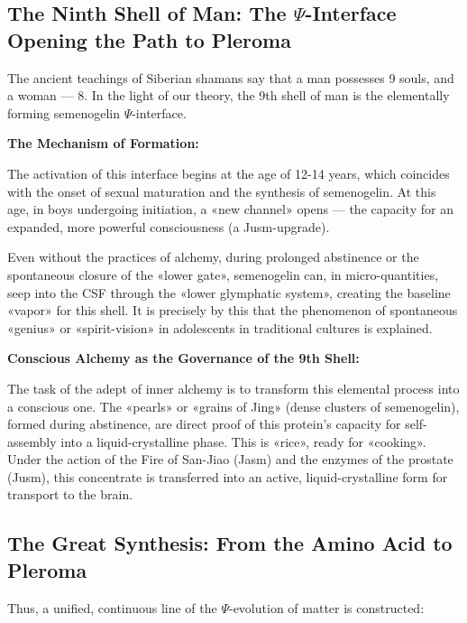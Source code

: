 \documentclass[a4paper,12pt]{article}
\begin{document}
	\subsection{The Ninth Shell of Man: The $\Psi$-Interface Opening the Path to Pleroma}
	
	The ancient teachings of Siberian shamans say that a man possesses 9 souls, and a woman — 8. In the light of our theory, the 9th shell of man is the elementally forming semenogelin $\Psi$-interface.
	
	\textbf{The Mechanism of Formation:}
	
	The activation of this interface begins at the age of 12-14 years, which coincides with the onset of sexual maturation and the synthesis of semenogelin. At this age, in boys undergoing initiation, a «new channel» opens — the capacity for an expanded, more powerful consciousness (a Jusm-upgrade).
	
	Even without the practices of alchemy, during prolonged abstinence or the spontaneous closure of the «lower gate», semenogelin can, in micro-quantities, seep into the CSF through the «lower glymphatic system», creating the baseline «vapor» for this shell. It is precisely by this that the phenomenon of spontaneous «genius» or «spirit-vision» in adolescents in traditional cultures is explained.
	
	\textbf{Conscious Alchemy as the Governance of the 9th Shell:}
	
	The task of the adept of inner alchemy is to transform this elemental process into a conscious one. The «pearls» or «grains of Jing» (dense clusters of semenogelin), formed during abstinence, are direct proof of this protein's capacity for self-assembly into a liquid-crystalline phase. This is «rice», ready for «cooking». Under the action of the Fire of San-Jiao (Jasm) and the enzymes of the prostate (Jusm), this concentrate is transferred into an active, liquid-crystalline form for transport to the brain.
	
	\subsection{The Great Synthesis: From the Amino Acid to Pleroma}
	
	Thus, a unified, continuous line of the $\Psi$-evolution of matter is constructed:
	
\end{document}
